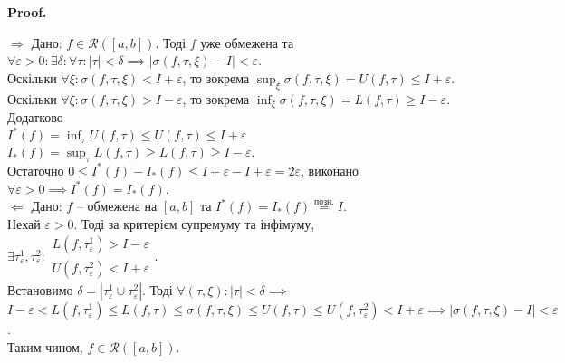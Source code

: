 \documentclass[a4paper, 10pt]{article}
\makeatletter
\def\huge{\displaystyle}
\def\qed{$\blacksquare$}
\def\rightproof{$\boxed{\Rightarrow}$ }
\def\leftproof{$\boxed{\Leftarrow}$ }
\theoremstyle{theoremdd}
\theoremstyle{theoremdd}
\theoremstyle{theoremdd}
\theoremstyle{theoremdd}
\theoremstyle{theoremdd}
\theoremstyle{theoremdd}
\theoremstyle{theoremdd}
\theoremstyle{theoremdd}
\theoremstyle{theoremdd}
\renewenvironment{proof}[1][Proof.\\]{\par
\pushQED{\hfill \qed}%
\normalfont \topsep6\p@\@plus6\p@\relax
\trivlist
\item\relax
{\bfseries
#1\@addpunct{.}}\hspace\labelsep\ignorespaces
}{%
\popQED\endtrivlist\@endpefalse
}
\makeatother
\begin{document}
\begin{proof}
\rightproof Дано: $f \in \mathcal{R}([a,b])$. Тоді $f$ уже обмежена та $\forall \varepsilon > 0: \exists \delta: \forall \tau: |\tau| < \delta \implies |\sigma(f, \tau, \xi) - I| < \varepsilon$.\\
Оскільки $\forall \xi: \sigma(f, \tau, \xi) < I + \varepsilon$, то зокрема $\huge\sup_{\xi} \sigma(f, \tau, \xi) = U(f,\tau) \leq I + \varepsilon$.\\
Оскільки $\forall \xi: \sigma(f, \tau, \xi) > I - \varepsilon$, то зокрема $\huge\inf_{\xi} \sigma(f, \tau, \xi) = L(f,\tau) \geq I - \varepsilon$.\\
Додатково \\
$I^*(f) = \huge\inf_\tau U(f,\tau) \leq U(f,\tau) \leq I + \varepsilon$\\
$I_*(f) = \huge\sup_\tau L(f,\tau) \geq L(f,\tau) \geq I - \varepsilon$.\\
Остаточно $0 \leq I^*(f) - I_*(f) \leq I+\varepsilon - I + \varepsilon = 2\varepsilon$, виконано $\forall \varepsilon > 0 \implies I^*(f) = I_*(f)$.
\bigskip \\
\leftproof Дано: $f$ -- обмежена на $[a,b]$ та $I^*(f) = I_*(f) \overset{\text{позн.}}{=} I$.\\
Нехай $\varepsilon > 0$. Тоді за критерієм супремуму та інфімуму, $\exists \tau_\varepsilon^1, \tau_\varepsilon^2: \begin{gathered} L(f,\tau_\varepsilon^1) > I - \varepsilon \\ U(f,\tau_\varepsilon^2) < I+\varepsilon \end{gathered}$.\\
Встановимо $\delta = |\tau^1_\varepsilon \cup \tau^2_\varepsilon|$. Тоді $\forall (\tau,\xi): |\tau| < \delta \implies$\\
$I-\varepsilon < L(f,\tau_\varepsilon^1) \leq L(f,\tau) \leq \sigma(f,\tau,\xi) \leq U(f,\tau) \leq U(f,\tau_\varepsilon^2) < I+\varepsilon \implies |\sigma(f,\tau,\xi) - I| < \varepsilon$.\\
Таким чином, $f \in \mathcal{R}([a,b])$.
\end{proof}
\end{document}
